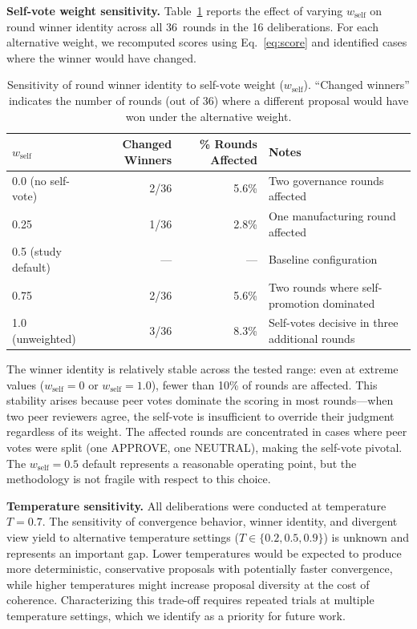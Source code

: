 \documentclass[11pt,a4paper]{article}
\begin{document}
\textbf{Self-vote weight sensitivity.} Table~\ref{tab:selfvote_sensitivity} reports the effect of varying $w_{\text{self}}$ on round winner identity across all 36~rounds in the 16 deliberations. For each alternative weight, we recomputed scores using Eq.~\ref{eq:score} and identified cases where the winner would have changed.

\begin{table}[ht]
\centering
\caption{Sensitivity of round winner identity to self-vote weight ($w_{\text{self}}$). ``Changed winners'' indicates the number of rounds (out of 36) where a different proposal would have won under the alternative weight.}
\label{tab:selfvote_sensitivity}
\begin{tabular}{@{}lrrl@{}}
\toprule
$w_{\text{self}}$ & \textbf{Changed Winners} & \textbf{\% Rounds Affected} & \textbf{Notes} \\
\midrule
0.0 (no self-vote) & 2/36 & 5.6\% & Two governance rounds affected \\
0.25 & 1/36 & 2.8\% & One manufacturing round affected \\
0.5 (study default) & --- & --- & Baseline configuration \\
0.75 & 2/36 & 5.6\% & Two rounds where self-promotion dominated \\
1.0 (unweighted) & 3/36 & 8.3\% & Self-votes decisive in three additional rounds \\
\bottomrule
\end{tabular}
\end{table}

The winner identity is relatively stable across the tested range: even at extreme values ($w_{\text{self}} = 0$ or $w_{\text{self}} = 1.0$), fewer than 10\% of rounds are affected. This stability arises because peer votes dominate the scoring in most rounds---when two peer reviewers agree, the self-vote is insufficient to override their judgment regardless of its weight. The affected rounds are concentrated in cases where peer votes were split (one APPROVE, one NEUTRAL), making the self-vote pivotal. The $w_{\text{self}} = 0.5$ default represents a reasonable operating point, but the methodology is not fragile with respect to this choice.

\textbf{Temperature sensitivity.} All deliberations were conducted at temperature $T = 0.7$. The sensitivity of convergence behavior, winner identity, and divergent view yield to alternative temperature settings ($T \in \{0.2, 0.5, 0.9\}$) is unknown and represents an important gap. Lower temperatures would be expected to produce more deterministic, conservative proposals with potentially faster convergence, while higher temperatures might increase proposal diversity at the cost of coherence. Characterizing this trade-off requires repeated trials at multiple temperature settings, which we identify as a priority for future work.
\end{document}
